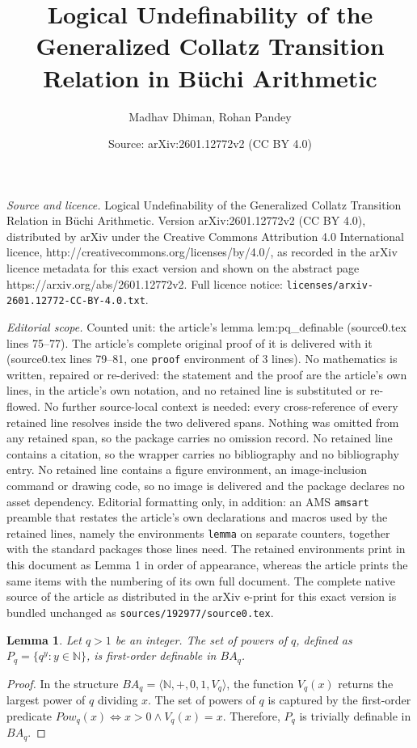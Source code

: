 \documentclass[10pt,a4paper]{amsart}
\title{Logical Undefinability of the Generalized Collatz Transition Relation in B\"uchi Arithmetic}
\author{Madhav Dhiman, Rohan Pandey}
\date{Source: arXiv:2601.12772v2 (CC BY 4.0)}
\newtheorem{lemma}{Lemma}
\begin{document}
\maketitle

\noindent\emph{Source and licence.} Logical Undefinability of the Generalized Collatz Transition Relation in B\"uchi Arithmetic. Version arXiv:2601.12772v2 (CC BY 4.0), distributed by arXiv under the Creative Commons Attribution 4.0 International licence, http://creativecommons.org/licenses/by/4.0/, as recorded in the arXiv licence metadata for this exact version and shown on the abstract page https://arxiv.org/abs/2601.12772v2. Full licence notice: \texttt{licenses/arxiv-2601.12772-CC-BY-4.0.txt}.\par\smallskip

\noindent\textit{Editorial scope.} Counted unit: the article's lemma lem:pq\_definable (source0.tex lines 75--77). The article's complete original proof of it is delivered with it (source0.tex lines 79--81, one \texttt{proof} environment of 3 lines). No mathematics is written, repaired or re-derived: the statement and the proof are the article's own lines, in the article's own notation, and no retained line is substituted or re-flowed.  No further source-local context is needed: every cross-reference of every retained line resolves inside the two delivered spans.  Nothing was omitted from any retained span, so the package carries no omission record.  No retained line contains a citation, so the wrapper carries no bibliography and no bibliography entry.  No retained line contains a figure environment, an image-inclusion command or drawing code, so no image is delivered and the package declares no asset dependency.  Editorial formatting only, in addition: an AMS \texttt{amsart} preamble that restates the article's own declarations and macros used by the retained lines, namely the environments \texttt{lemma} on separate counters, together with the standard packages those lines need.  The retained environments print in this document as Lemma 1 in order of appearance, whereas the article prints the same items with the numbering of its own full document.  The complete native source of the article as distributed in the arXiv e-print for this exact version is bundled unchanged as \texttt{sources/192977/source0.tex}.
\begin{lemma} \label{lem:pq_definable}
Let $q > 1$ be an integer. The set of powers of $q$, defined as $P_q = \{q^y : y \in \mathbb{N}\}$, is first-order definable in $BA_q$.
\end{lemma}

\begin{proof}
In the structure $BA_q = \langle \mathbb{N}, +, 0, 1, V_q \rangle$, the function $V_q(x)$ returns the largest power of $q$ dividing $x$. The set of powers of $q$ is captured by the first-order predicate $Pow_q(x) \iff x > 0 \land V_q(x) = x$. Therefore, $P_q$ is trivially definable in $BA_q$.
\end{proof}
\end{document}
